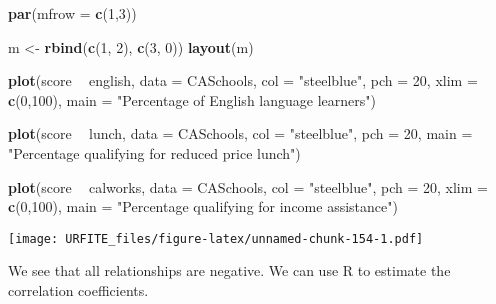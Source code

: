 \documentclass[]{book}
\newenvironment{Shaded}{\begin{snugshade}}{\end{snugshade}}
\newcommand{\KeywordTok}[1]{\textcolor[rgb]{0.13,0.29,0.53}{\textbf{#1}}}
\newcommand{\DataTypeTok}[1]{\textcolor[rgb]{0.13,0.29,0.53}{#1}}
\newcommand{\DecValTok}[1]{\textcolor[rgb]{0.00,0.00,0.81}{#1}}
\newcommand{\StringTok}[1]{\textcolor[rgb]{0.31,0.60,0.02}{#1}}
\newcommand{\CommentTok}[1]{\textcolor[rgb]{0.56,0.35,0.01}{\textit{#1}}}
\newcommand{\OperatorTok}[1]{\textcolor[rgb]{0.81,0.36,0.00}{\textbf{#1}}}
\newcommand{\NormalTok}[1]{#1}
\theoremstyle{definition}
\theoremstyle{definition}
\theoremstyle{definition}
\theoremstyle{remark}
\begin{document}
\begin{Shaded}
\begin{Highlighting}[]
\KeywordTok{par}\NormalTok{(}\DataTypeTok{mfrow =} \KeywordTok{c}\NormalTok{(}\DecValTok{1}\NormalTok{,}\DecValTok{3}\NormalTok{))}

\NormalTok{m <-}\StringTok{ }\KeywordTok{rbind}\NormalTok{(}\KeywordTok{c}\NormalTok{(}\DecValTok{1}\NormalTok{, }\DecValTok{2}\NormalTok{), }\KeywordTok{c}\NormalTok{(}\DecValTok{3}\NormalTok{, }\DecValTok{0}\NormalTok{))}
\KeywordTok{layout}\NormalTok{(m)}

\KeywordTok{plot}\NormalTok{(score }\OperatorTok{~}\StringTok{ }\NormalTok{english, }
     \DataTypeTok{data =}\NormalTok{ CASchools, }
     \DataTypeTok{col =} \StringTok{"steelblue"}\NormalTok{, }
     \DataTypeTok{pch =} \DecValTok{20}\NormalTok{, }
     \DataTypeTok{xlim =} \KeywordTok{c}\NormalTok{(}\DecValTok{0}\NormalTok{,}\DecValTok{100}\NormalTok{), }
     \DataTypeTok{main =} \StringTok{"Percentage of English language learners"}\NormalTok{)}

\KeywordTok{plot}\NormalTok{(score }\OperatorTok{~}\StringTok{ }\NormalTok{lunch, }
     \DataTypeTok{data =}\NormalTok{ CASchools, }
     \DataTypeTok{col =} \StringTok{"steelblue"}\NormalTok{, }
     \DataTypeTok{pch =} \DecValTok{20}\NormalTok{,}
     \DataTypeTok{main =} \StringTok{"Percentage qualifying for reduced price lunch"}\NormalTok{)}

\KeywordTok{plot}\NormalTok{(score }\OperatorTok{~}\StringTok{ }\NormalTok{calworks, }
     \DataTypeTok{data =}\NormalTok{ CASchools, }
     \DataTypeTok{col =} \StringTok{"steelblue"}\NormalTok{, }
     \DataTypeTok{pch =} \DecValTok{20}\NormalTok{, }
     \DataTypeTok{xlim =} \KeywordTok{c}\NormalTok{(}\DecValTok{0}\NormalTok{,}\DecValTok{100}\NormalTok{), }
     \DataTypeTok{main =} \StringTok{"Percentage qualifying for income assistance"}\NormalTok{)}
\end{Highlighting}
\end{Shaded}

\texttt{[image: URFITE\_files/figure-latex/unnamed-chunk-154-1.pdf]}

We see that all relationships are negative. We can use R to estimate the
correlation coefficients.

\begin{Shaded}
\end{Shaded}
\end{document}
